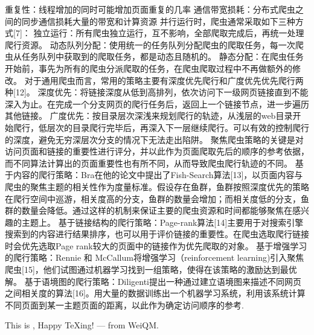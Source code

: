\documentclass[doctor,privacy,twoside]{buaa_mac}
\begin{document}
重复性：线程增加的同时可能增加页面重复的几率
通信带宽损耗：分布式爬虫之间的同步通信损耗大量的带宽和计算资源
并行运行时，爬虫通常采取如下三种方式[7]：
独立运行：所有爬虫独立运行，互不影响，全部爬取完成后，再统一处理爬行资源。
动态队列分配：使用统一的任务队列分配爬虫的爬取任务，每一次爬虫从任务队列中获取到的爬取任务，都是动态且随机的。
静态分配：在爬虫任务开始前，事先为所有的爬虫分派爬取的任务，在爬虫爬取过程中不再做额外的修改。
对于通用爬虫而言，常用的策略主要有深度优先爬行和广度优先优先爬行两种[12]。
深度优先：将链接深度从低到高排列，依次访问下一级网页链接直到不能深入为止。在完成一个分支网页的爬行任务后，返回上一个链接节点，进一步遍历其他链接。
广度优先：按目录层次深浅来规划爬行的轨迹，从浅层的web目录开始爬行，低层次的目录爬行完毕后，再深入下一层继续爬行。可以有效的控制爬行的深度，避免无穷深层次分支的情况下无法走出陷阱。
聚焦爬虫策略的关键是对访问页面和链接的重要性进行评分，并以此作为页面爬取先后的顺序的参考依据，而不同算法计算出的页面重要性也有所不同，从而导致爬虫爬行轨迹的不同。
基于内容的爬行策略：Bra在他的论文中提出了Fish-Search算法[13]，以页面内容与爬虫的聚焦主题的相关性作为度量标准。假设存在鱼群，鱼群按照深度优先的策略在爬行空间中巡游，相关度高的分支，鱼群的数量会增加；而相关度低的分支，鱼群的数量会降低。通过这样的机制来保证主要的爬虫资源和时间都能够聚焦在感兴趣的主题上。 
基于链接结构的爬行策略：Page-rank算法[14]主要用于对搜索引擎搜索到的内容进行结果排序，也可以用于评价链接的重要性。在爬虫选取爬行链接时会优先选取Page rank较大的页面中的链接作为优先爬取的对象。
基于增强学习的爬行策略：Rennie 和 McCallum将增强学习（reinforcement learning)引入聚焦爬虫[15]，他们试图通过机器学习找到一组策略，使得在该策略的激励达到最优解。
基于语境图的爬行策略：Diligenti提出一种通过建立语境图来描述不同网页之间相关度的算法[16]。用大量的数据训练出一个机器学习系统，利用该系统计算不同页面到某一主题页面的距离，以此作为确定访问顺序的参考.



















\vspace{5cm}

This is \BUAAThesis{}, Happy TeXing! --- from WeiQM.
\end{document}
